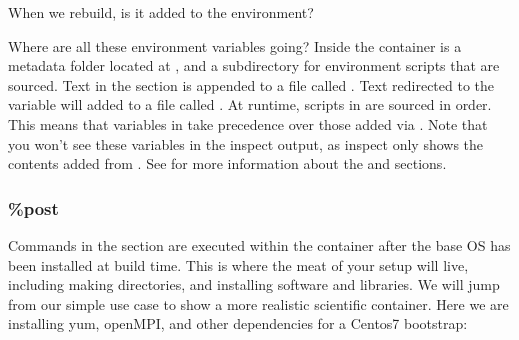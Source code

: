 \documentclass[letterpaper,10pt,english]{sphinxmanual}
\begin{document}
When we rebuild, is it added to the environment?

%
\begin{sphinxVerbatim}[commandchars=\\\{\}]
      

\end{sphinxVerbatim}

Where are all these environment variables going? Inside the container
is a metadata folder located at , and a subdirectory  for environment
scripts that are sourced. Text in the  section is appended to a file
called . Text redirected to the  variable will added to a file called .
At runtime, scripts in  are sourced in order. This means that variables
in  take precedence over those added via . Note that you won’t see
these variables in the inspect output, as inspect only shows the
contents added from .
See  for more information about
the  and  sections.


\subsubsection{\%post}
\label{\detokenize{container_recipes:post}}
Commands in the  section are executed within the container after the base
OS has been installed at build time. This is where the meat of your
setup will live, including making directories, and installing software
and libraries. We will jump from our simple use case to show a more
realistic scientific container. Here we are installing yum, openMPI, and
other dependencies for a Centos7 bootstrap:
\end{document}
